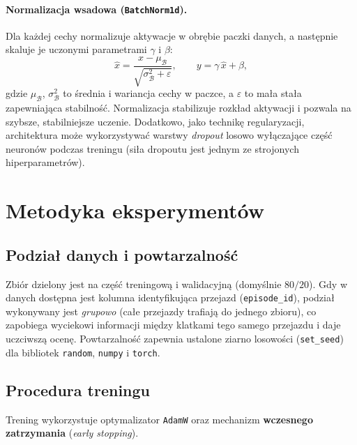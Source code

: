 \documentclass[11pt,a4paper]{article}
\begin{document}
\paragraph{Normalizacja wsadowa (\texttt{BatchNorm1d}).}
Dla każdej cechy normalizuje aktywacje w obrębie paczki danych, a następnie skaluje
je uczonymi parametrami $\gamma$ i $\beta$:
\begin{equation}
\hat{x} = \frac{x - \mu_{\mathcal{B}}}{\sqrt{\sigma_{\mathcal{B}}^2 + \varepsilon}},
\qquad y = \gamma\,\hat{x} + \beta,
\label{eq:batchnorm}
\end{equation}
gdzie $\mu_{\mathcal{B}}$, $\sigma_{\mathcal{B}}^2$ to średnia i wariancja cechy
w paczce, a $\varepsilon$ to mała stała zapewniająca stabilność. Normalizacja
stabilizuje rozkład aktywacji i pozwala na szybsze, stabilniejsze uczenie.
Dodatkowo, jako technikę regularyzacji, architektura może wykorzystywać warstwy
\emph{dropout} losowo wyłączające część neuronów podczas treningu (siła dropoutu
jest jednym ze strojonych hiperparametrów).

\section{Metodyka eksperymentów}
\label{sec:metodyka}

\subsection{Podział danych i powtarzalność}

Zbiór dzielony jest na część treningową i walidacyjną (domyślnie $80/20$).
Gdy w danych dostępna jest kolumna identyfikująca przejazd (\texttt{episode\_id}),
podział wykonywany jest \emph{grupowo} (całe przejazdy trafiają do jednego zbioru),
co zapobiega wyciekowi informacji między klatkami tego samego przejazdu i daje
uczciwszą ocenę. Powtarzalność zapewnia ustalone ziarno losowości
(\texttt{set\_seed}) dla bibliotek \texttt{random}, \texttt{numpy} i \texttt{torch}.

\subsection{Procedura treningu}

Trening wykorzystuje optymalizator \texttt{AdamW} oraz mechanizm \textbf{wczesnego
zatrzymania} (\emph{early stopping}).
\end{document}
